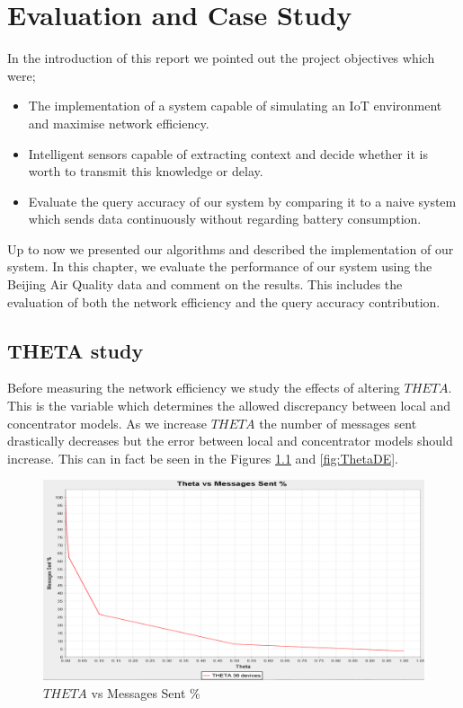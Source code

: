 \documentclass{mproj}
\begin{document}
\chapter{Evaluation and Case Study}
In the introduction of this report we pointed out the project objectives which were;
\begin{itemize}  
\item The implementation of a system capable of simulating an IoT environment and maximise network efficiency.
\item Intelligent sensors capable of extracting context and decide whether it is worth to transmit this knowledge or delay.
\item Evaluate the query accuracy of our system by comparing it to a naive system which sends data continuously without regarding battery consumption.  
\end{itemize} 
Up to now we presented our algorithms and described the implementation of our system. In this chapter, we evaluate the performance of our system using the Beijing Air Quality data\cite{air-quality-inference-meets-big-data} and comment on the results. This includes the evaluation of both the network efficiency and the query accuracy contribution.

\section{THETA study}
Before measuring the network efficiency we study the effects of altering $THETA$. This is the variable which determines the allowed discrepancy between local and concentrator models. As we increase $THETA$ the number of messages sent drastically decreases but the error between local and concentrator models should increase. This can in fact be seen in the Figures \ref{fig:ThetaMessages} and \ref{fig:ThetaDE}.

\begin{figure}[H]
\caption{$THETA$ vs Messages Sent \%}
\label{fig:ThetaMessages}
\centerline{\includegraphics[scale=0.4]{ThetaMessages}}
\end{figure}
\end{document}
